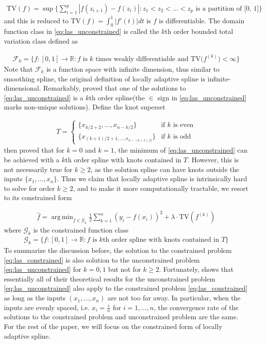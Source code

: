 \documentclass[a4paper]{article}
\DeclareMathOperator*{\argmin}{arg\,min}
\newcommand{\RR}{\mathbb{R}}
\renewcommand{\cal}{\mathcal}
\begin{document}
\begin{align*}
\text{TV}(f) = \sup\{\sum_{i=1}^p |f(z_{i+1}) - f(z_i)|:z_1<z_2<\ldots<z_p \text{ is a partition of [0, 1]}\}
\end{align*}
and this is reduced to $\text{TV}(f) = \int_0^1|f'(t)|dt$ is $f$ is differentiable. The domain function class in \eqref{eq:las_unconstrained} is called the $k$th order bounded total variation class defined as 

\begin{align*}
\cal{F}_k = \{f:[0, 1]\rightarrow\RR: f \text{ is $k$ times weakly differentiable and TV($f^{(k)}$)$<\infty$}\}
\end{align*}
Note that $\cal{F}_k$ is a function space with infinite dimension, thus similar to smoothing spline, the original definition of locally adaptive spline is infinite-dimensional. Remarkably, \cite{mammen1997locally} proved that one of the solutions to \eqref{eq:las_unconstrained} is a $k$th order spline(the $\in$ sign in \eqref{eq:las_unconstrained} marks non-unique solutions). Define the knot superset

\begin{align}
T = 
\begin{cases}
\{x_{k/2+2}, \ldots, x_{n-k/2}\} & \text{if $k$ is even}\\
\{x_{(k+1)/2+1, \ldots, x_{n-(k+1)/2}}\} & \text{if $k$ is odd}
\end{cases}
\label{eq:knotT}
\end{align}
then \cite{mammen1997locally} proved that for $k = 0$ and $k = 1$, the minimum of \eqref{eq:las_unconstrained} can be achieved with a $k$th order spline with knots contained in $T$. However, this is not necessarily true for $k\geq 2$, as the solution spline can have knots outside the inputs $\{x_1,\ldots, x_n\}$. Thus we claim that locally adaptive spline is intrinsically hard to solve for order $k\geq 2$, and to make it more computationally tractable, we resort to its constrained form

\begin{align}
\hat{f} = \argmin_{f\in\cal{G}_k} \frac{1}{2}\sum_{k=1}^n (y_i - f(x_i))^2 + \lambda\cdot\text{TV}(f^{(k)})
\label{eq:las_constrained}
\end{align}
where $\cal{G}_k$ is the constrained function class
\begin{align*}
\cal{G}_k = \{f:[0, 1]\rightarrow\RR:\text{$f$ is $k$th order spline with knots contained in $T$}\}
\end{align*}
To summarize the discussion before, the solution to the constrained problem  \eqref{eq:las_constrained} is also solution to the unconstrained problem \eqref{eq:las_unconstrained} for $k = 0, 1$ but not for $k\geq 2$. Fortunately, \cite{mammen1997locally} shows that essentially all of their theoretical results for the unconstrained problem \eqref{eq:las_unconstrained} also apply to the constrained problem \eqref{eq:las_constrained} as long as the inputs $(x_1,\ldots, x_n)$ are not too far away. In particular, when the inputs are evenly spaced, i.e. $x_i=\frac{i}{n}$ for $i=1,\ldots, n$, the convergence rate of the solutions to the constrained problem and unconstrained problem are the same. For the rest of the paper, we will focus on the constrained form of locally adaptive spline. 
\end{document}
